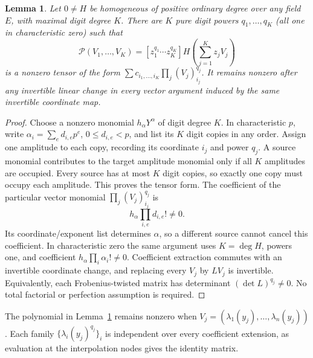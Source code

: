 \documentclass[11pt]{article}
\newtheorem{lemma}[theorem]{Lemma}
\begin{document}
\begin{lemma}\label{lem:polar}
Let $0\ne H$ be homogeneous of positive ordinary degree over any
field $E$, with maximal digit degree $K$. There are $K$ pure digit
powers $q_1,\ldots,q_K$ (all one in characteristic zero) such that
\[
 \mathcal P(V_1,\ldots,V_K)=
 [z_1^{q_1}\cdots z_K^{q_K}]
 H\left(\sum_{j=1}^K z_jV_j\right)
\]
is a nonzero tensor of the form
$\sum c_{i_1,\ldots,i_K}\prod_j(V_j)_{i_j}^{q_j}$.
It remains nonzero after any invertible linear change in every vector
argument induced by the same invertible coordinate map.
\end{lemma}
\begin{proof}
Choose a nonzero monomial $h_\alpha Y^\alpha$ of digit degree $K$.
In characteristic $p$, write $\alpha_i=\sum_e d_{i,e}p^e$,
$0\le d_{i,e}<p$, and list its $K$ digit copies in any order.
Assign one amplitude to each copy, recording its coordinate $i_j$
and power $q_j$. A source monomial contributes to the target amplitude
monomial only if all $K$ amplitudes are occupied. Every source has at
most $K$ digit copies, so exactly one copy must occupy each amplitude.
This proves the tensor form. The coefficient of the particular vector
monomial $\prod_j(V_j)_{i_j}^{q_j}$ is
\[
 h_\alpha\prod_{i,e}d_{i,e}!\ne0.
\]
Its coordinate/exponent list determines $\alpha$, so a different
source cannot cancel this coefficient. In characteristic zero the same
argument uses $K=\deg H$, powers one, and coefficient
$h_\alpha\prod_i\alpha_i!\ne0$.
Coefficient extraction commutes with an invertible coordinate change,
and replacing every $V_j$ by $LV_j$ is invertible. Equivalently, each
Frobenius-twisted matrix has determinant $(\det L)^{q_j}\ne0$.
No total factorial or perfection assumption is required.
\end{proof}

The polynomial in Lemma~\ref{lem:polar} remains nonzero when
$V_j=(\lambda_1(y_j),\ldots,\lambda_n(y_j))$. Each family
$\{\lambda_i(y_j)^{q_j}\}_i$ is independent over every coefficient
extension, as evaluation at the interpolation nodes gives the identity
matrix.
\end{document}
